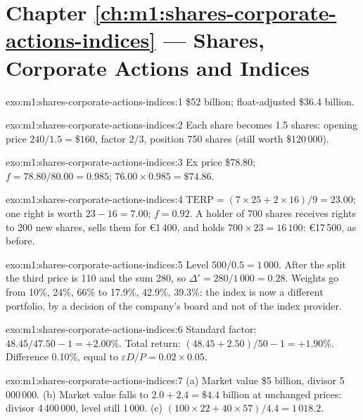 \section*{Chapter \ref{ch:m1:shares-corporate-actions-indices} --- Shares, Corporate Actions and Indices}

\begin{solution}{exo:m1:shares-corporate-actions-indices:1}
\$52 billion; float-adjusted \$36.4 billion.
\end{solution}

\begin{solution}{exo:m1:shares-corporate-actions-indices:2}
Each share becomes 1.5 shares: opening price $240/1.5 = \$160$, factor
$2/3$, position 750 shares (still worth \$120\,000).
\end{solution}

\begin{solution}{exo:m1:shares-corporate-actions-indices:3}
Ex price \$78.80; $f = 78.80/80.00 = 0.985$; $76.00 \times 0.985 = \$74.86$.
\end{solution}

\begin{solution}{exo:m1:shares-corporate-actions-indices:4}
$\mathrm{TERP} = (7\times25 + 2\times16)/9 = 23.00$; one right is worth
$23 - 16 = 7.00$; $f = 0.92$. A holder of 700 shares receives rights to 200
new shares, sells them for \euro 1\,400, and holds $700 \times 23 = 16\,100$:
\euro 17\,500, as before.
\end{solution}

\begin{solution}{exo:m1:shares-corporate-actions-indices:5}
Level $500/0.5 = 1\,000$. After the split the third price is 110 and the sum
280, so $\Delta' = 280/1\,000 = 0.28$. Weights go from 10\%, 24\%, 66\% to
17.9\%, 42.9\%, 39.3\%: the index is now a different portfolio, by a decision
of the company's board and not of the index provider.
\end{solution}

\begin{solution}{exo:m1:shares-corporate-actions-indices:6}
Standard factor: $48.45/47.50 - 1 = +2.00\%$. Total return: $(48.45 +
2.50)/50 - 1 = +1.90\%$. Difference 0.10\%, equal to $\varepsilon D/P = 0.02
\times 0.05$.
\end{solution}

\begin{solution}{exo:m1:shares-corporate-actions-indices:7}
(a) Market value \$5 billion, divisor 5\,000\,000. (b) Market value falls to
$2.0 + 2.4 = \$4.4$ billion at unchanged prices: divisor 4\,400\,000, level
still 1\,000. (c) $(100\times22 + 40\times57)/4.4 = 1\,018.2$.
\end{solution}

